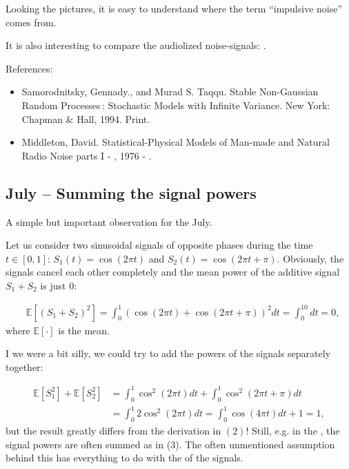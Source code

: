 \documentclass{article}
\begin{document}
Looking the pictures, it is easy to understand where the term ``impulsive noise'' comes from.


It is also interesting to compare the audiolized noise-signals:
.



References:
\begin{itemize}
\item Samorodnitsky, Gennady., and Murad S. Taqqu. Stable Non-Gaussian Random Processes : Stochastic Models with Infinite Variance. New York: Chapman & Hall, 1994. Print.
\item Middleton, David. Statistical-Physical Models of Man-made and Natural Radio Noise parts I - , 1976 - .
\end{itemize}




\subsection{July – Summing the signal powers}

A simple but important observation for the July.

Let us consider two sinusoidal signals of opposite phases during the time $t \in [0,1]$: $S_1(t) = \cos(2 \pi t)$ and $S_2(t) = \cos(2 \pi t + \pi).$ Obviously, the signals cancel each other completely and the mean power of the additive signal $ S_1 + S_2$ is just $0$:

\begin{align}
  &\mathbb{E}[(S_1 + S_2)^2] = \int_0^1 (\cos(2 \pi t) + \cos(2 \pi t + \pi))^2dt = \int_0^10 dt = 0,
\end{align}
where $\mathbb{E}[\cdot]$ is the mean.


I we were a bit silly, we could try to add the powers of the signals separately together:

\begin{align}
  \mathbb{E}[S_1^2] + \mathbb{E}[S_2^2] &=   \int_0^1 \cos^2(2 \pi t) dt + \int_0^1 \cos^2(2 \pi  t + \pi) dt \\
  &= \int_0^1 2 \cos^2(2 \pi t)  dt= \int_0^1 \cos(4 \pi t)dt + 1 = 1, \nonumber
\end{align}
but the result greatly differs from the derivation in $(2)$! Still, e.g. in the , the signal powers are often summed as in (3). The often unmentioned assumption behind this has everything to do with the  of the signals.
\end{document}
